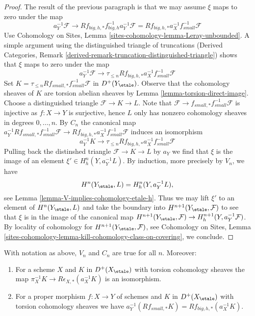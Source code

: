 \begin{proof}
\medskip\noindent
The result of the previous paragraph is that we may assume
$\xi$ maps to zero under the map
$$
a_Y^{-1}\mathcal{F} \longrightarrow
Rf_{big, h, *}f_{big, h}^{-1}a_Y^{-1}\mathcal{F} =
Rf_{big, h, *}a_X^{-1}f_{small}^{-1}\mathcal{F}
$$
Use Cohomology on Sites, Lemma \ref{sites-cohomology-lemma-Leray-unbounded}.
A simple argument using the distinguished triangle of truncations
(Derived Categories, Remark
\ref{derived-remark-truncation-distinguished-triangle}) shows that
$\xi$ maps to zero under the map
$$
a_Y^{-1}\mathcal{F} \longrightarrow
\tau_{\leq n}Rf_{big, h, *}a_X^{-1}f_{small}^{-1}\mathcal{F}
$$
Set $K = \tau_{\leq n}Rf_{small, *}f_{small}^{-1}\mathcal{F}$
in $D^+(Y_\etale)$. Observe that the cohomology sheaves of $K$ are
torsion abelian sheaves by Lemma \ref{lemma-torsion-direct-image}.
Choose a distinguished triangle $\mathcal{F} \to K \to L$.
Note that $\mathcal{F} \to f_{small, *}f_{small}^{-1}\mathcal{F}$ is injective
as $f : X \to Y$ is surjective, hence $L$ only has nonzero
cohomology sheaves in degrees $0, \ldots, n$. By $C_n$ the canonical map
$a_Y^{-1}Rf_{small, *}f_{small}^{-1}\mathcal{F} \to
Rf_{big, h, *}a_X^{-1}f_{small}^{-1}\mathcal{F}$
induces an isomorphism
$$
a_Y^{-1}K \longrightarrow
\tau_{\leq n}Rf_{big, h, *}a_X^{-1}f_{small}^{-1}\mathcal{F}
$$
Pulling back the distinshed triangle $\mathcal{F} \to K \to L$
by $a_Y$ we find that $\xi$ is the image of an element
$\xi' \in H^n_h(Y, a_Y^{-1}L)$.
By induction, more precisely by $V_n$, we have
$$
H^n(Y_\etale, L) = H^n_h(Y, a_Y^{-1}L),
$$
see Lemma \ref{lemma-V-implies-cohomology-etale-h}.
Thus we may lift $\xi'$ to an element of $H^n(Y_\etale, L)$
and take the boundary into $H^{n + 1}(Y_\etale, \mathcal{F})$
to see that $\xi$ is in the image of the canonical map
$H^{n + 1}(Y_\etale, \mathcal{F}) \to
H^{n + 1}_h(Y, a_Y^{-1}\mathcal{F})$.
By locality of cohomology for $H^{n + 1}(Y_\etale, \mathcal{F})$, see
Cohomology on Sites, Lemma
\ref{sites-cohomology-lemma-kill-cohomology-class-on-covering},
we conclude.
\end{proof}

\begin{lemma}
\label{lemma-V-C-all-n-etale-h}
With notation as above, $V_n$ and $C_n$ are true for all $n$. Moreover:
\begin{enumerate}
\item For a scheme $X$ and $K$ in $D^+(X_\etale)$ with torsion
cohomology sheaves the map
$\pi_X^{-1}K \to R\epsilon_{X, *}(a_X^{-1}K)$ is an isomorphism.
\item For a proper morphism $f : X \to Y$ of schemes
and $K$ in $D^+(X_\etale)$ with torsion cohomology sheaves we have
$a_Y^{-1}(Rf_{small, *}K) = Rf_{big, h, *}(a_X^{-1}K)$.
\end{enumerate}
\end{lemma}

